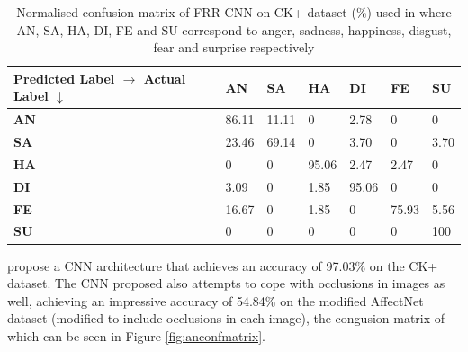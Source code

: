 \documentclass[12pt, a4paper]{article}
\begin{document}
\begin{table}[H]
	\centering
	\begin{tabular}{|P{3.5cm}|P{1.2cm}|P{1.2cm}|P{1.2cm}|P{1.2cm}|P{1.2cm}|P{1.2cm}|}
		\hline
		Predicted Label $\rightarrow$ Actual Label $\downarrow$ & \normalsize{\textbf{AN}} & \normalsize{\textbf{SA}} & \normalsize{\textbf{HA}} & \normalsize{\textbf{DI}} & \normalsize{\textbf{FE}} & \normalsize{\textbf{SU}}
		\\ \hline

        \textbf{AN}	& 86.11 & 11.11 &	0	& 2.78	& 0	&0\\ \hline
        \textbf{SA}	& 23.46	&69.14&	0&	3.70	&0	&3.70\\ \hline
        \textbf{HA}	& 0	& 0	&95.06	&2.47	&2.47	&0\\ \hline
        \textbf{DI}	& 3.09	&0	&1.85	&95.06	&0	&0\\ \hline
        \textbf{FE}	& 16.67&	0	&1.85	&0	&75.93	&5.56\\ \hline
        \textbf{SU}	& 0&	0&	0	&0	&0	&100\\ \hline
    
    \end{tabular}
	\caption{Normalised confusion matrix of FRR-CNN on CK+ dataset (\%) used in \cite{xie2017facial} where AN, SA, HA, DI, FE and SU correspond to anger, sadness, happiness, disgust, fear and surprise respectively}
	\label{tab:confmatrix}
\end{table}

\cite{li2018occlusion} propose a CNN architecture that achieves an accuracy of 97.03\% on the CK+ dataset. The CNN proposed also attempts to cope with occlusions in images as well, achieving an impressive accuracy of 54.84\% on the modified AffectNet dataset (modified to include occlusions in each image), the congusion matrix of which can be seen in Figure \ref{fig:anconfmatrix}. 
\end{document}
